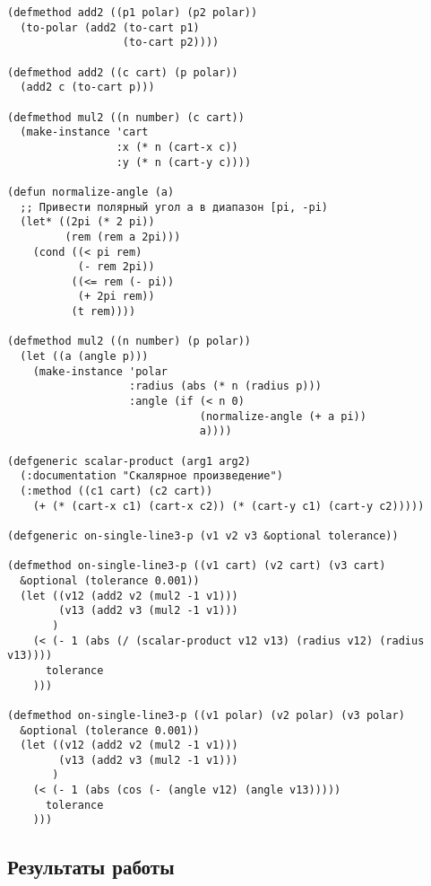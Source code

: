\documentclass[12pt]{article}
\begin{document}
\begin{verbatim}
(defmethod add2 ((p1 polar) (p2 polar))
  (to-polar (add2 (to-cart p1)
                  (to-cart p2))))

(defmethod add2 ((c cart) (p polar))
  (add2 c (to-cart p)))

(defmethod mul2 ((n number) (c cart))
  (make-instance 'cart
                 :x (* n (cart-x c))
                 :y (* n (cart-y c))))

(defun normalize-angle (a)
  ;; Привести полярный угол a в диапазон [pi, -pi)
  (let* ((2pi (* 2 pi))
         (rem (rem a 2pi)))
    (cond ((< pi rem)
           (- rem 2pi))
          ((<= rem (- pi))
           (+ 2pi rem))
          (t rem))))

(defmethod mul2 ((n number) (p polar))
  (let ((a (angle p)))
    (make-instance 'polar
                   :radius (abs (* n (radius p)))
                   :angle (if (< n 0)
                              (normalize-angle (+ a pi))
                              a))))

(defgeneric scalar-product (arg1 arg2)
  (:documentation "Скалярное произведение")
  (:method ((c1 cart) (c2 cart))
    (+ (* (cart-x c1) (cart-x c2)) (* (cart-y c1) (cart-y c2)))))

(defgeneric on-single-line3-p (v1 v2 v3 &optional tolerance))

(defmethod on-single-line3-p ((v1 cart) (v2 cart) (v3 cart)
  &optional (tolerance 0.001))
  (let ((v12 (add2 v2 (mul2 -1 v1)))
        (v13 (add2 v3 (mul2 -1 v1)))
       )
    (< (- 1 (abs (/ (scalar-product v12 v13) (radius v12) (radius v13))))
      tolerance
    )))

(defmethod on-single-line3-p ((v1 polar) (v2 polar) (v3 polar)
  &optional (tolerance 0.001))
  (let ((v12 (add2 v2 (mul2 -1 v1)))
        (v13 (add2 v3 (mul2 -1 v1)))
       )
    (< (- 1 (abs (cos (- (angle v12) (angle v13)))))
      tolerance
    )))
\end{verbatim}

\subsection{Результаты работы}
\end{document}
